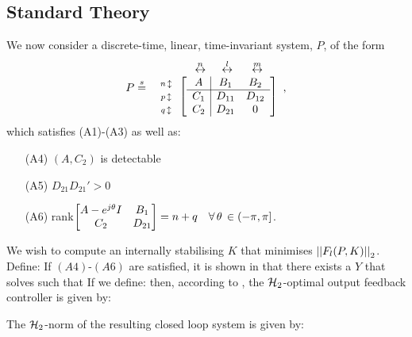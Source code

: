 \label{sec:H2OF}
\subsection{Standard Theory}
\label{subsec:stdH2OF}
We now consider a discrete-time, linear, time-invariant system, $P$, of the form $$P \shorteq \arr{c}{\hspace{0.8cm}\stackrel{n}{\leftrightarrow}\hspace{0.5cm}\stackrel{l}{\leftrightarrow}\hspace{0.6cm}\stackrel{m}{\leftrightarrow} \\\arr{c}{\scriptstyle{n} \,\updownarrow\\\scriptstyle{p} \,\updownarrow\\\scriptstyle{q} \,\updownarrow} \ma{\arr{c|cc}{ A&B_1&B_2\\\hline C_1&D_{11}&D_{12}\\C_2&D_{21}&0}}},$$
which satisfies (A1)-(A3) as well as:
\begin{itemize}
\item[(A4)] $(A,C_2)$ is detectable 
\item[(A5)] $D_{21}D_{21}'>0$
\item[(A6)] rank$\ma{A-e^{j\theta}I&B_1\\C_2& D_{21}}=n+q\quad \forall\, \theta \,\in (-\pi,\pi]$.
\end{itemize}
%
We wish to compute an internally stabilising $K$ that minimises $\nrm{F_l(P,K)}_2$. Define:
%
If $(A4)$-$(A6)$ are satisfied, it is shown in \cite{ZDG} that there exists a $Y$ that solves
such that 
If we define: 
then, according to \cite{ZDG}, the $\htwo$-optimal output feedback controller is given by:

The $\htwo$-norm of the resulting closed loop system is given by:


